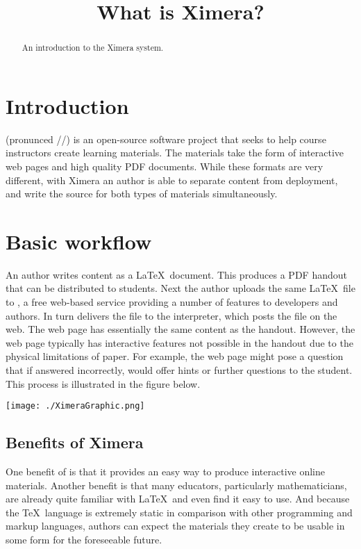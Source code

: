 \documentclass{ximera}
\title{What is Ximera?}
\begin{document}
\begin{abstract}
An introduction to the Ximera system.
\end{abstract}
\maketitle


\section{Introduction}

 (pronunced //) is an
open-source software project that seeks to help course instructors
create learning materials.  The materials take the form of interactive
web pages and high quality PDF documents.  While these formats are
very different, with Ximera an author is able to separate content from
deployment, and write the source for both types of materials
simultaneously.

\section{Basic workflow}

An author writes content as a \LaTeX\ document.  This produces a PDF
handout that can be distributed to students.  Next the author uploads
the same \LaTeX\ file to , a free
web-based service providing a number of features to developers and
authors.  In turn  delivers the
file to the  interpreter, which
  posts the file on the web.  The web page has essentially the same
  content as the handout.  However, the web page typically has
  interactive features not possible in the handout due to the physical
  limitations of paper.  For example, the web page might pose a
  question that if answered incorrectly, would offer hints or further
  questions to the student.  This process is illustrated in the figure
  below.

\begin{image}
\texttt{[image: ./XimeraGraphic.png]}
\end{image}

\subsection{Benefits of Ximera}
One benefit of  is that it
provides an easy way to produce interactive online materials.  Another
benefit is that many educators, particularly mathematicians, are
already quite familiar with \LaTeX\ and even find it easy to use.  And
because the \TeX\ language is extremely static in comparison with
other programming and markup languages, authors can expect the
 materials they create to be
usable in some form for the foreseeable future.
\end{document}
